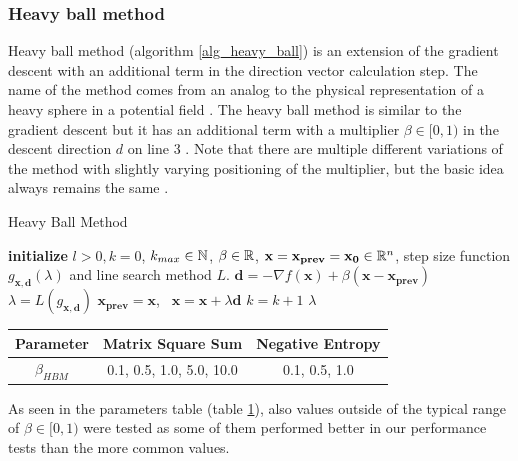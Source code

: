 \documentclass[english, 12pt, a4paper, sci, utf8, a-1b, online, table]{aaltothesis}
\newcommand{\vect}[1]{\ensuremath{\mathbf{#1}}}
\newcommand{\norm}[1]{\ensuremath\Vert #1 \Vert}
\newcommand{\R}{\ensuremath\mathbb{R}}
\newcommand{\N}{\ensuremath\mathbb{N}}
\begin{document}
\subsubsection{Heavy ball method}


Heavy ball method (algorithm \ref{alg_heavy_ball}) is an extension of the gradient descent with an additional term in the direction vector calculation step. The name of the method comes from an analog to the physical representation of a heavy sphere in a potential field \cite{book:heavy_ball_origin}. The heavy ball method is similar to the gradient descent but it has an additional term with a multiplier $\beta \in [0, 1)$ in the descent direction $d$ on line 3 \cite{ghadimi2014global}. Note that there are multiple different variations of the method with slightly varying positioning of the multiplier, but the basic idea always remains the same \cite{ghadimi2014global} \cite{book:heavy_ball_origin}.

\begin{algorithm}[H]
\caption{Heavy Ball Method}
\label{alg_heavy_ball}
\begin{algorithmic}[1]
\STATE \textbf{initialize} $l > 0, k = 0$, $k_{max} \in \N$, $\beta \in \R$, $\vect{x} = \vect{x_{prev}} = \vect{x_0} \in \R^n$, step size function $g_{\vect{x}, \vect{d}}(\lambda)$ and line search method $L$.
\WHILE{$\norm{\nabla f(\vect{x})} > l$ \AND $k < k_{max}$}
    \STATE $\vect{d} = -\nabla f(\vect{x}) + \beta (\vect{x} - \vect{x_{prev}})$
    \STATE $\lambda = L(g_{\vect{x}, \vect{d}})$
    \STATE $\vect{x_{prev}} = \vect{x}$, \ $\vect{x} = \vect{x} + \lambda \vect{d}$
    \STATE $k = k + 1$
\ENDWHILE
\RETURN $\lambda$
\end{algorithmic}
\end{algorithm}

\begin{table}[H]
\label{tab:params_HeavyBallMethod}
\centering
{}
\begin{tabular}{|c|c|c|}
\hline
\rowcolor{gray!25}
Parameter & Matrix Square Sum & Negative Entropy \\
\hline
$\beta_{HBM}$ & 0.1, 0.5, 1.0, 5.0, 10.0 & 0.1, 0.5, 1.0 \\
\hline
\end{tabular}
\end{table}

As seen in the parameters table (table \ref{tab:params_HeavyBallMethod}), also values outside of the typical range of $\beta \in [0, 1)$ were tested as some of them performed better in our performance tests than the more common values.
\end{document}
